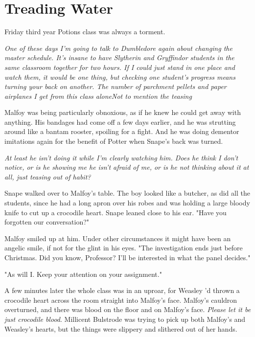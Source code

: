 
\chapter{Treading Water}

Friday third year Potions class was always a torment.

\emph{One of these days I'm going to talk to Dumbledore again about changing the master schedule. It's insane to have Slytherin and Gryffindor students in the same classroom together for two hours. If I could just stand in one place and watch them, it would be one thing, but checking one student's progress means turning your back on another. The number of parchment pellets and paper airplanes I get from this class alone{\el}Not to mention the teasing{\el}}

Malfoy was being particularly obnoxious, as if he knew he could get away with anything. His bandages had come off a few days earlier, and he was strutting around like a bantam rooster, spoiling for a fight. And he was doing dementor imitations again for the benefit of Potter when Snape's back was turned.

\emph{At least he isn't doing it while I'm clearly watching him. Does he think I don't notice, or is he showing me he isn't afraid of me, or is he not thinking about it at all, just teasing out of habit?}

Snape walked over to Malfoy's table. The boy looked like a butcher, as did all the students, since he had a long apron over his robes and was holding a large bloody knife to cut up a crocodile heart. Snape leaned close to his ear. "Have you forgotten our conversation?"

Malfoy smiled up at him. Under other circumstances it might have been an angelic smile, if not for the glint in his eyes. "The investigation ends just before Christmas. Did you know, Professor? I'll be interested in what the panel decides."

"As will I. Keep your attention on your assignment."

A few minutes later the whole class was in an uproar, for Weasley 'd thrown a crocodile heart across the room straight into Malfoy's face. Malfoy's cauldron overturned, and there was blood on the floor and on Malfoy's face. \emph{Please let it be just crocodile blood}. Millicent Bulstrode was trying to pick up both Malfoy's and Weasley's hearts, but the things were slippery and slithered out of her hands.

